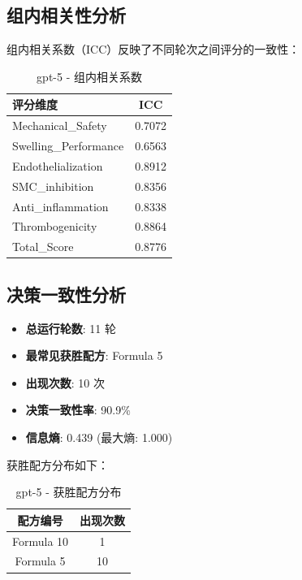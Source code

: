 \documentclass[12pt,a4paper]{article}
\begin{document}
\subsection{组内相关性分析}

组内相关系数（ICC）反映了不同轮次之间评分的一致性：

\begin{table}[H]
\centering
\caption{gpt-5 - 组内相关系数}
\begin{tabular}{lc}
\toprule
\textbf{评分维度} & \textbf{ICC} \\
\midrule
Mechanical\_Safety & 0.7072 \\
Swelling\_Performance & 0.6563 \\
Endothelialization & 0.8912 \\
SMC\_inhibition & 0.8356 \\
Anti\_inflammation & 0.8338 \\
Thrombogenicity & 0.8864 \\
Total\_Score & 0.8776 \\
\bottomrule
\end{tabular}
\end{table}

\subsection{决策一致性分析}


\begin{itemize}
    \item \textbf{总运行轮数}: 11 轮
    \item \textbf{最常见获胜配方}: Formula 5
    \item \textbf{出现次数}: 10 次
    \item \textbf{决策一致性率}: 90.9\%
    \item \textbf{信息熵}: 0.439 (最大熵: 1.000)
\end{itemize}

获胜配方分布如下：

\begin{table}[H]
\centering
\caption{gpt-5 - 获胜配方分布}
\begin{tabular}{cc}
\toprule
\textbf{配方编号} & \textbf{出现次数} \\
\midrule
Formula 10 & 1 \\
Formula 5 & 10 \\
\bottomrule
\end{tabular}
\end{table}
\end{document}
